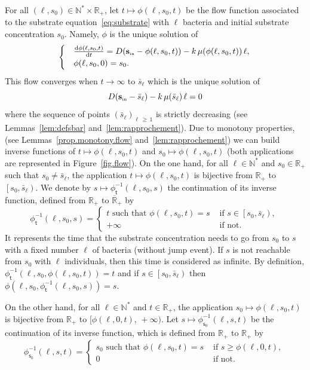 \documentclass[AHL,Unicode,longabstracts,published]{cedram}
\newcommand{\RR}{\mathbb{R}}
\newcommand{\NN}{\mathbb{N}}
\newcommand{\Sin}{{\mathbf s}_{\textrm{\tiny\rm in}}}
\newcommand{\dif}{\mathrm{d}}
\newcommand{\ensco}[2]{\left[#1,#2\right)}
\newcommand{\phit}{\phi_\textsf{t}^{-1}}
\newcommand{\phis}{\phi_{\textsf{s}_0}^{-1}}
\newcommand{\1}{\mathbf{1}}
\begin{document}
For all $(\ell,s_0)\in \NN^*\times \RR_+$, let $t\mapsto \phi(\ell,s_0,t)$ be the flow function associated to the substrate equation~\eqref{eq:substrate} with $\ell$ bacteria and initial substrate concentration $s_0$. Namely, $\phi$ is the unique solution of
\begin{align}\label{eq:flow}
\begin{cases}
&\frac{\dif \phi(\ell,s_0,t)}{\dif t} = D(\Sin-\phi(\ell,s_0,t))-k\,\mu(\phi(\ell,s_0,t))\,\ell,\\
& \phi(\ell,s_0,0)= s_0.
\end{cases}\,
\end{align}
This flow converges when $t\to\infty$ to $\bar s_\ell$ which is the unique solution of
\begin{equation}\label{eq:defsbar}
D(\Sin-\bar s_\ell)-k\,\mu(\bar s_\ell)\,\ell = 0
\end{equation}
where the sequence of points $(\bar s_\ell)_{\ell\,\geq\,1}$ is strictly decreasing (see Lemmas~\ref{lem:defsbar} and~\ref{lem:rapprochement}). Due to monotony properties, (see Lemmas~\ref{prop.monotony.flow} and~\ref{lem:rapprochement}) we can build inverse functions of $t \mapsto \phi(\ell, s_0, t)$ and $s_0 \mapsto \phi(\ell, s_0, t)$ (both applications are represented in Figure~\ref{fig.flow}). On the one hand, for all $\ell\in \NN^*$ and $s_0\in\RR_+$ such that $s_0\neq \bar s_\ell$, the application $t\mapsto \phi(\ell,s_0,t)$ is bijective from $\RR_+$ to $\ensco{s_0}{\bar s_\ell}$. We denote by $s \mapsto \phit(\ell,s_0,s)$ the continuation of its inverse function, defined from $\RR_+$ to $\overline{\RR}_+$ by
\[
\phit(\ell,s_0,s) =
\begin{cases}
t \text{ such that } \phi(\ell,s_0,t)=s & \text{ if } s \in \ensco{s_0}{\bar s_\ell},\\
+ \infty & \text{ if not}.
\end{cases}\,
\]
It represents the time that the substrate concentration needs to go from $s_0$ to $s$ with a fixed number $\ell$ of bacteria (without jump event). If $s$ is not reachable from $s_0$ with $\ell$ individuals, then this time is considered as infinite. By definition, $\phit(\ell,s_0,\phi(\ell,s_0,t))=t$ and if $s \in \ensco{s_0}{\bar s_\ell}$ then $\phi(\ell,s_0,\phit(\ell,s_0,s))=s$.



On the other hand, for all $\ell \in \NN^*$ and $t\in\RR_+$, the application $s_0 \mapsto \phi(\ell,s_0,t)$ is bijective from $\RR_+$ to $[\phi(\ell,0,t),\,+\infty)$. Let $s\mapsto \phis(\ell,s, t)$ be the continuation of its inverse function, which is defined from $\RR_+$ to $\RR_+$ by
\[
\phis(\ell,s,t) =
\begin{cases}
s_0 \text{ such that } \phi(\ell,s_0,t)=s & \text{ if } s \geq \phi(\ell,0,t), \\
0 & \text{ if not}.
\end{cases}\,
\]
\end{document}

